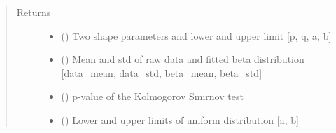 \documentclass[letterpaper,10pt,english,openany,oneside]{sphinxmanual}
\begin{document}
\begin{fulllineitems}
\begin{quote}
\begin{description}
\item[{Returns}] \leavevmode
\begin{itemize}
\item {} 
 () \textendash{} Two shape parameters and lower and upper limit {[}p, q, a, b{]}

\item {} 
 () \textendash{} Mean and std of raw data and fitted beta distribution {[}data\_mean, data\_std, beta\_mean, beta\_std{]}

\item {} 
 () \textendash{} p-value of the Kolmogorov Smirnov test

\item {} 
 () \textendash{} Lower and upper limits of uniform distribution {[}a, b{]}

\end{itemize}


\end{description}\end{quote}

\end{fulllineitems}

\end{document}
